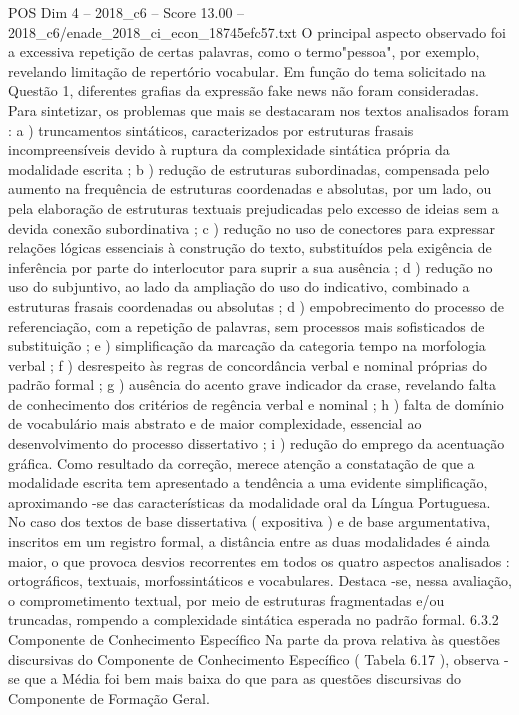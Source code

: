 \begin{textsample}{POS Dim 4 – 2018\_c6 – Score 13.00 – 2018\_c6/enade\_2018\_ci\_econ\_18745efc57.txt}
O principal aspecto observado foi a excessiva repetição de certas palavras, como o termo"pessoa", por exemplo, revelando limitação de repertório vocabular.
Em função do tema solicitado na Questão 1, diferentes grafias da expressão fake news não foram consideradas.
Para sintetizar, os problemas que mais se destacaram nos textos analisados foram : a ) truncamentos sintáticos, caracterizados por estruturas frasais incompreensíveis devido à ruptura da complexidade sintática própria da modalidade escrita ; b ) redução de estruturas subordinadas, compensada pelo aumento na frequência de estruturas coordenadas e absolutas, por um lado, ou pela elaboração de estruturas textuais prejudicadas pelo excesso de ideias sem a devida conexão subordinativa ; c ) redução no uso de conectores para expressar relações lógicas essenciais à construção do texto, substituídos pela exigência de inferência por parte do interlocutor para suprir a sua ausência ; d ) redução no uso do subjuntivo, ao lado da ampliação do uso do indicativo, combinado a estruturas frasais coordenadas ou absolutas ; d ) empobrecimento do processo de referenciação, com a repetição de palavras, sem processos mais sofisticados de substituição ; e ) simplificação da marcação da categoria tempo na morfologia verbal ; f ) desrespeito às regras de concordância verbal e nominal próprias do padrão formal ; g ) ausência do acento grave indicador da crase, revelando falta de conhecimento dos critérios de regência verbal e nominal ; h ) falta de domínio de vocabulário mais abstrato e de maior complexidade, essencial ao desenvolvimento do processo dissertativo ; i ) redução do emprego da acentuação gráfica.
Como resultado da correção, merece atenção a constatação de que a modalidade escrita tem apresentado a tendência a uma evidente simplificação, aproximando -se das características da modalidade oral da Língua Portuguesa.
No caso dos textos de base dissertativa ( expositiva ) e de base argumentativa, inscritos em um registro formal, a distância entre as duas modalidades é ainda maior, o que provoca desvios recorrentes em todos os quatro aspectos analisados : ortográficos, textuais, morfossintáticos e vocabulares.
Destaca -se, nessa avaliação, o comprometimento textual, por meio de estruturas fragmentadas e/ou truncadas, rompendo a complexidade sintática esperada no padrão formal. 6.3.2 Componente de Conhecimento Específico Na parte da prova relativa às questões discursivas do Componente de Conhecimento Específico ( Tabela 6.17 ), observa -se que a Média foi bem mais baixa do que para as questões discursivas do Componente de Formação Geral.

\end{textsample}
